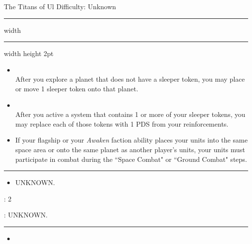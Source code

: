 \newpage
{\handel\Huge The Titans of Ul} \hfill {\Large Difficulty: Unknown} \vspace{-4pt}\\
\hrule width \hsize \kern 1mm \hrule width \hsize height 2pt


\begin{multicols}{2}


\begin{itemize}
\item {}\\
After you explore a planet that does not have a sleeper token, you may place or move 1 sleeper token onto that planet.
\item {}\\
After you active a system that contains 1 or more of your sleeper tokens, you may replace each of those tokens with 1 PDS from your reinforcements.
\item {} If your flagship or your \emph{Awaken} faction ability places your units into the same space area or onto the same planet as another player’s units, your units must participate in combat during the ``Space Combat" or ``Ground Combat" steps. 
\end{itemize}


\vspace{-10pt}\rule{\hsize}{0.4pt}\vspace{5pt}


\vspace{-5pt}
\begin{multicols}{2}
\begin{itemize}
\item UNKNOWN. %
\end{itemize}
\end{multicols}

\vspace{-5pt}
: 2

\vspace{2pt}
: UNKNOWN. %

\rule{\hsize}{0.4pt}\vspace{5pt}


\begin{itemize}
\item \magen
\end{itemize}


\end{multicols}
